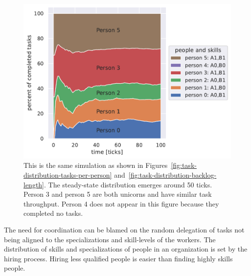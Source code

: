 \begin{figure}[H] %
\centering
\includegraphics[width=1\textwidth]{images/task_distribution_percent_of_tasks_per_person_simCount1_skills2_levels1_taskduration1_people6_social0_ticks100.pdf}
\caption{This is the same simulation as shown in Figures~\ref{fig:task-distribution-tasks-per-person} and~\ref{fig:task-distribution-backlog-length}. The steady-state distribution emerges around 50 ticks. Person 3 and person 5 are both unicorns and have similar task throughput. Person 4 does not appear in this figure because they completed no tasks.}
\label{fig:task-distribution-percent-of-tasks}
\end{figure}






The need for coordination can be blamed on the random delegation of tasks not being aligned to the specializations and skill-levels of the workers. 
The distribution of skills and specializations of people in an organization is set by the hiring process. Hiring less qualified people is easier than finding highly skills people. 



